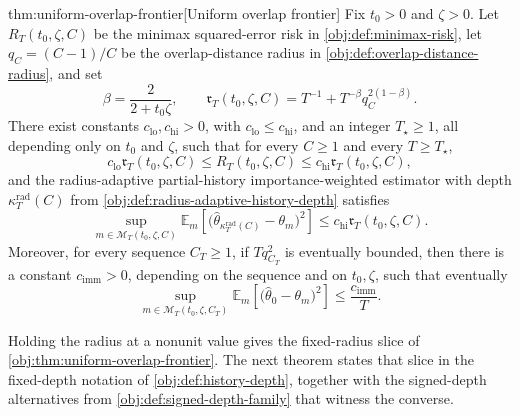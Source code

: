 \begin{theoremv}{thm:uniform-overlap-frontier}[Uniform overlap frontier]
Fix \(t_0>0\) and \(\zeta>0\).  Let \(R_T(t_0,\zeta,C)\) be the minimax squared-error risk in \cref{obj:def:minimax-risk}, let \(q_C=(C-1)/C\) be the overlap-distance radius in \cref{obj:def:overlap-distance-radius}, and set
\[
\beta=\frac{2}{2+t_0\zeta},
\qquad
\mathfrak r_T(t_0,\zeta,C)
=
T^{-1}+T^{-\beta}q_C^{2(1-\beta)} .
\]
There exist constants \(c_{\mathrm{lo}},c_{\mathrm{hi}}>0\), with
\(c_{\mathrm{lo}}\le c_{\mathrm{hi}}\), and an integer \(T_\star\ge 1\), all depending only on \(t_0\) and \(\zeta\), such that for every \(C\ge 1\) and every \(T\ge T_\star\),
\[
c_{\mathrm{lo}}\mathfrak r_T(t_0,\zeta,C)
\le
R_T(t_0,\zeta,C)
\le
c_{\mathrm{hi}}\mathfrak r_T(t_0,\zeta,C),
\]
and the radius-adaptive partial-history importance-weighted estimator with depth
\(\kappa_T^{\mathrm{rad}}(C)\) from \cref{obj:def:radius-adaptive-history-depth} satisfies
\[
\sup_{m\in\mathcal M_T(t_0,\zeta,C)}
\mathbb E_m\!\left[
  \bigl(\widehat\theta_{\kappa_T^{\mathrm{rad}}(C)}-\theta_m\bigr)^2
\right]
\le
c_{\mathrm{hi}}\mathfrak r_T(t_0,\zeta,C).
\]
Moreover, for every sequence \(C_T\ge 1\), if \(Tq_{C_T}^2\) is eventually bounded, then there is a constant \(c_{\mathrm{imm}}>0\), depending on the sequence and on \(t_0,\zeta\), such that eventually
\[
\sup_{m\in\mathcal M_T(t_0,\zeta,C_T)}
\mathbb E_m\!\left[
  \bigl(\widehat\theta_{0}-\theta_m\bigr)^2
\right]
\le
\frac{c_{\mathrm{imm}}}{T}.
\]
\end{theoremv}

Holding the radius at a nonunit value gives the fixed-radius slice of \cref{obj:thm:uniform-overlap-frontier}. The next theorem states that slice in the fixed-depth notation of \cref{obj:def:history-depth}, together with the signed-depth alternatives from \cref{obj:def:signed-depth-family} that witness the converse.

